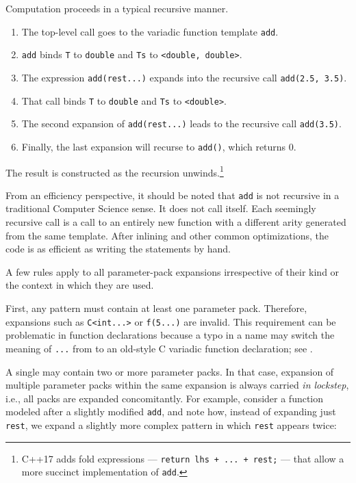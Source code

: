\noindent Computation proceeds in a typical recursive manner.
\begin{enumerate}
\item{The top-level call goes to the variadic function template \lstinline!add!.}
\item{\lstinline!add! binds \lstinline!T! to \lstinline!double! and \lstinline!Ts! to \lstinline!<double,!~\lstinline!double>!.}
\item{The expression \lstinline!add(rest...)! expands into the recursive call \lstinline!add(2.5,!~\lstinline!3.5)!.}
\item{That call binds \lstinline!T! to \lstinline!double! and \lstinline!Ts! to \lstinline!<double>!.}
\item{The second expansion of \lstinline!add(rest...)! leads to the recursive call \lstinline!add(3.5)!.}
\item{Finally, the last expansion will recurse to \lstinline!add()!, which returns 0.}
\end{enumerate}
The result is constructed as the recursion
unwinds.{\cprotect\footnote{C++17 adds fold expressions ---
\lstinline!return!~\lstinline!lhs!~\lstinline!+!~\lstinline!...!~\lstinline!+!~\lstinline!rest;!
  --- that allow a more succinct implementation of \lstinline!add!.}}

From an efficiency perspective, it should be noted that \lstinline!add! is
not recursive in a traditional Computer Science sense. It does not call
itself. Each seemingly recursive call is a call to an entirely new
function with a different arity generated from the same template. After
inlining and other common optimizations, the code is as efficient as
writing the statements by hand.

A few rules apply to all parameter-pack expansions irrespective of their
kind or the context in which they are used.

First, any pattern must contain at least one parameter pack. Therefore,
expansions such as \lstinline!C<int...>! or \lstinline!f(5...)! are invalid.
This requirement can be problematic in function declarations because a
typo in a name may switch the meaning of \lstinline!...! from
 to an old-style C variadic function
declaration; see .

A single  may contain two or more parameter
packs. In that case, expansion of multiple parameter packs within the
same expansion is always carried \emph{in lockstep}, i.e., all packs are
expanded concomitantly. For example, consider a function modeled after a
slightly modified \lstinline!add!, and note how, instead of expanding just
\lstinline!rest!, we expand a slightly more complex pattern in which
\lstinline!rest! appears twice:

